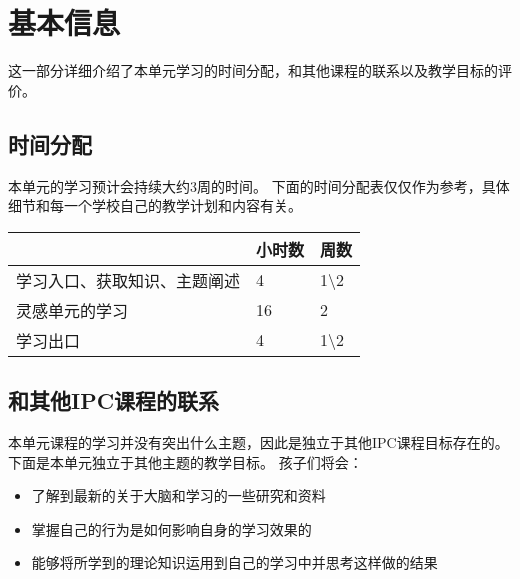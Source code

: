 
\chapter{基本信息}
    这一部分详细介绍了本单元学习的时间分配，和其他课程的联系以及教学目标的评价。

\section{时间分配}
    本单元的学习预计会持续大约3周的时间。
    下面的时间分配表仅仅作为参考，具体细节和每一个学校自己的教学计划和内容有关。


\begin{table}[h]     
\begin{tabular}{l|l|l}
\hline
\colorbox[gray]{0.95}{ & 小时数 & 周数 } \\
\hline
学习入口、获取知识、主题阐述 &  4 & 1\textbackslash2 \\
灵感单元的学习  & 16  &   2  \\
学习出口  & 4  &  1\textbackslash2 \\
\hline
\end{tabular}
\end{table}



\section{和其他IPC课程的联系}
    本单元课程的学习并没有突出什么主题，因此是独立于其他IPC课程目标存在的。下面是本单元独立于其他主题的教学目标。
    孩子们将会：
    \begin{itemize}
      \item 了解到最新的关于大脑和学习的一些研究和资料 
      \item 掌握自己的行为是如何影响自身的学习效果的
      \item 能够将所学到的理论知识运用到自己的学习中并思考这样做的结果
    \end{itemize}

